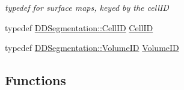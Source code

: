 \begin{DoxyCompactItemize}
\begin{DoxyCompactList}\small\item\em typedef for surface maps, keyed by the cell\+ID \end{DoxyCompactList}\item 
typedef \hyperlink{namespace_d_d4hep_1_1_d_d_segmentation_ac7af071d85cb48820914434a07e21ba1}{D\+D\+Segmentation\+::\+Cell\+ID} \hyperlink{namespace_d_d4hep_1_1_d_d_rec_af5cecc2e566eeaedb430b92df23971d4}{Cell\+ID}
\item 
typedef \hyperlink{namespace_d_d4hep_1_1_d_d_segmentation_a61a6833a18d1800bdef176595f83e3ba}{D\+D\+Segmentation\+::\+Volume\+ID} \hyperlink{namespace_d_d4hep_1_1_d_d_rec_a5b5fea15b3678944e1aba487a746bdcb}{Volume\+ID}
\end{DoxyCompactItemize}
\subsection*{Functions}
